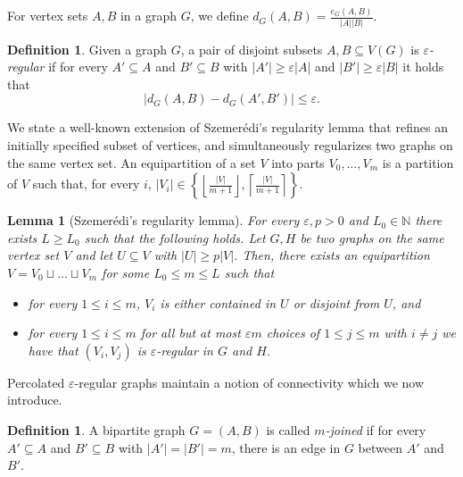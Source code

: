 \documentclass[10pt]{article}
\newtheorem{lemma}[theorem]{Lemma}
\theoremstyle{definition}
\newtheorem{definition}[theorem]{Definition}
\newcommand\eps{\varepsilon}
\let\leq\leqslant
\let\geq\geqslant
\begin{document}
For vertex sets $A,B$ in a graph $G$,
we define $d_G(A,B)=\frac{e_G(A,B)}{|A||B|}$.
\begin{definition}
    Given a graph $G$, a pair of disjoint subsets $A,B\subseteq V(G)$ is \textit{$\varepsilon$-regular} if for every $A'\subseteq A$ and $B'\subseteq B$ with $|A'|\geq\varepsilon|A|$ and $|B'|\geq\varepsilon|B|$ it holds that 
    $$
    |d_G(A,B)-d_G(A',B')|\leq\varepsilon.
    $$
\end{definition}
We state a well-known extension of Szemer\'edi's regularity lemma that refines an initially specified subset of vertices, and simultaneously regularizes two graphs on the same vertex set. An equipartition of a set $V$ into parts $V_0,\ldots, V_m$ is a partition of $V$ such that, for every $i$, $|V_i|\in\left\{\left\lfloor\frac{|V|}{m+1}\right\rfloor,\left\lceil\frac{|V|}{m+1}\right\rceil\right\}$.
\begin{lemma}[Szemer\'edi's regularity lemma]\label{lem: regularity}
    For every $\varepsilon,p>0$ and $L_0\in\mathbb N$ there exists $L\geq L_0$ such that the following holds. Let $G,H$ be two graphs on the same vertex set $V$ and let $U\subseteq V$ with $|U|\geq p|V|$. Then, there exists an equipartition $V=V_0\sqcup\ldots\sqcup V_m$ for some $L_0\leq m\leq L$ such that
    \begin{itemize} 
        \item for every $1\leq i\leq m$, $V_i$ is either contained in $U$ or disjoint from $U$, and 
        \item for every $1\leq i\leq m$ for all but at most $\varepsilon m$ choices of $1\leq j\leq m$ with $i\neq j$ we have that $(V_i,V_j)$ is $\varepsilon$-regular in $G$ and $H$.
    \end{itemize}
\end{lemma}
Percolated $\eps$-regular graphs maintain a notion of connectivity which we now introduce.

\begin{definition}
    A bipartite graph $G=(A,B)$ is called \textit{$m$-joined} if for every $A'\subseteq A$ and $B'\subseteq B$ with $|A'|=|B'|=m$, there is an edge in $G$ between $A'$ and $B'$.
\end{definition}
\end{document}
